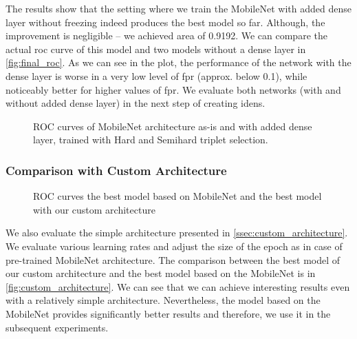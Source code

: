 The results show that the setting where we train the MobileNet with added dense layer without freezing indeed produces the best model so far. Although, the improvement is negligible -- we achieved area of 0.9192. We can compare the actual \gls{roc} curve of this model and two models without a dense layer in \autoref{fig:final_roc}. As we can see in the plot, the performance of the network with the dense layer is worse in a very low level of \gls{fpr} (approx. below 0.1), while noticeably better for higher values of \gls{fpr}. We evaluate both networks (with and without added dense layer) in the next step of creating \glspl{iden}.


\begin{figure}
    \centering
    \def\svgwidth{\columnwidth}
    
    \caption[ROC curves of MobileNet architecture with various alterations]{ROC curves of MobileNet architecture as-is and with added dense layer, trained with Hard and Semihard triplet selection.}
    \label{fig:final_roc}
\end{figure}


\subsubsection{Comparison with Custom Architecture}

\begin{figure}
    \centering
    \def\svgwidth{\columnwidth}
    
    \caption{ROC curves the best model based on MobileNet and the best model with our custom architecture}
    \label{fig:custom_architecture}
\end{figure}

We also evaluate the simple architecture presented in \autoref{ssec:custom_architecture}. We evaluate various learning rates and adjust the size of the epoch as in case of pre-trained MobileNet architecture. The comparison between the best model of our custom architecture and the best model based on the MobileNet is in \autoref{fig:custom_architecture}. We can see that we can achieve interesting results even with a relatively simple architecture. Nevertheless, the model based on the MobileNet provides significantly better results and therefore, we use it in the subsequent experiments.

